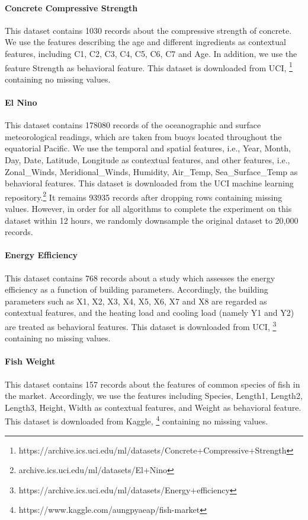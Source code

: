 \documentclass[pdflatex,sn-basic]{sn-jnl}%
\theoremstyle{thmstyleone}%
\theoremstyle{thmstyletwo}%
\theoremstyle{thmstylethree}%
\begin{document}
\begin{appendices}
\paragraph{Concrete Compressive Strength } This dataset contains 1030 records about the compressive strength of concrete. We use the features describing the age and different ingredients as contextual features, including C1, C2, C3, C4, C5, C6, C7 and Age. In addition, we use the feature Strength as behavioral feature. This dataset is downloaded from UCI, \footnote{https://archive.ics.uci.edu/ml/datasets/Concrete+Compressive+Strength} containing no missing values.

\paragraph{El Nino } This dataset contains 178080 records of the oceanographic and surface meteorological readings, which are 
taken from buoys located throughout the equatorial Pacific. We use the temporal and spatial features, i.e., Year, Month, Day, Date, Latitude, Longitude as contextual features, and other features, i.e., Zonal\_Winds, Meridional\_Winds, Humidity, Air\_Temp, Sea\_Surface\_Temp as behavioral features. This dataset is downloaded from the UCI machine learning repository.\footnote{archive.ics.uci.edu/ml/datasets/El+Nino} It remains 93935 records after dropping rows containing missing values. However, in order for all algorithms to complete the experiment on this dataset within 12 hours, we randomly downsample the original dataset to 20,000 records.

\paragraph{Energy Efficiency} This dataset contains 768 records about a study which assesses the energy efficiency as a function of building parameters. Accordingly, the building parameters such as X1, X2, X3, X4, X5, X6, X7 and X8 are regarded as contextual features, and the heating load and cooling load (namely Y1 and Y2) are treated as behavioral features. This dataset is downloaded from UCI, \footnote{https://archive.ics.uci.edu/ml/datasets/Energy+efficiency} containing no missing values.

\paragraph{Fish Weight } This dataset contains 157 records about the features of common species of fish in the market. Accordingly, we use the features including Species, Length1, Length2, Length3, Height, Width as contextual features, and Weight as behavioral feature. This dataset is downloaded from Kaggle, \footnote{https://www.kaggle.com/aungpyaeap/fish-market} containing no missing values.


\end{appendices}
\end{document}
